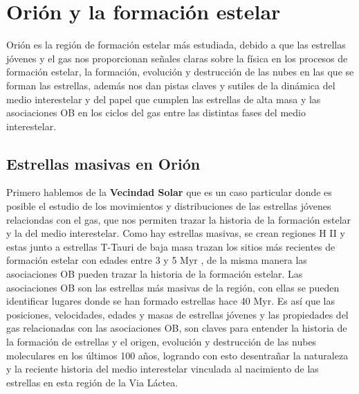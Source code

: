 \section{Orión y la formación estelar}
\label{sec:formation} 


Orión es la región de formación estelar más estudiada, debido a que las estrellas jóvenes y el gas nos proporcionan señales claras sobre la física en los procesos de formación estelar, la formación, evolución  y destrucción de las nubes en las que se forman las estrellas, además nos dan pistas claves y sutiles de la dinámica del medio interestelar y del papel que cumplen las estrellas de alta masa y las asociaciones OB en los ciclos del gas entre las distintas fases del medio interestelar.\\

\subsection{Estrellas masivas en Orión}
\label{sec:star}

Primero hablemos de la \textbf{Vecindad Solar} que es un caso particular donde es posible el estudio de los movimientos y distribuciones de las estrellas jóvenes relaciondas con el gas, que nos permiten trazar la historia de la formación estelar y la del medio interestelar. Como hay estrellas masivas, se crean regiones H II y estas junto a estrellas T-Tauri de baja masa trazan los sitios más recientes de formación estelar con edades entre 3 y 5 Myr \citep{Bally:2008a}, de la misma manera las asociaciones OB pueden trazar la historia de la formación estelar. Las asociaciones OB son las estrellas más masivas de la región, con ellas se pueden identificar lugares donde se han formado estrellas hace 40 Myr. Es así que las posiciones, velocidades, edades y masas de estrellas jóvenes y las propiedades del gas relacionadas con las asociaciones OB, son claves para entender la historia de la formación de estrellas y el origen, evolución y destrucción de las nubes moleculares en los últimos 100 años, logrando con esto desentrañar la naturaleza y la reciente historia del medio interestelar vinculada al nacimiento de las estrellas en esta región de la Via Láctea.\\

